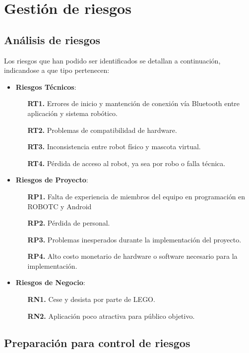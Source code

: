 \chapter{Gesti\'on de riesgos}
\newpage
\section{An\'alisis de riesgos}

Los riesgos que han podido ser identificados se detallan a continuaci\'on, indicandose a que tipo pertenecen:

\begin{itemize}
\item {\bf Riesgos T\'ecnicos}:
  \begin{itemize}
  \item[{\bf RT1.}] Errores de inicio y mantenci\'on de conexi\'on v\'ia Bluetooth entre aplicaci\'on y sistema rob\'otico.
  \item[{\bf RT2.}] Problemas de compatibilidad de hardware.
  \item[{\bf RT3.}] Inconsistencia entre robot f\'isico y mascota virtual.
  \item[{\bf RT4.}] P\'erdida de acceso al robot, ya sea por robo o falla t\'ecnica.
  \end{itemize}
\item {\bf Riesgos de Proyecto}:
  \begin{itemize}
  \item[{\bf RP1.}] Falta de experiencia de miembros del equipo en programaci\'on en ROBOTC y Android
  \item[{\bf RP2.}] P\'erdida de personal.
  \item[{\bf RP3.}] Problemas inesperados durante la implementaci\'on del proyecto.
  \item[{\bf RP4.}] Alto costo monetario de hardware o software necesario para la implementaci\'on.
  \end{itemize}
\item {\bf Riesgos de Negocio}:
  \begin{itemize}
  \item[{\bf RN1.}] Cese y desista por parte de LEGO.
  \item[{\bf RN2.}] Aplicaci\'on poco atractiva para p\'ublico objetivo.
  \end{itemize}
\end{itemize}

\section{Preparaci\'on para control de riesgos}

